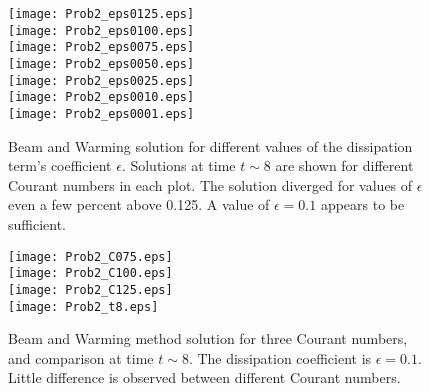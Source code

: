 \documentclass[11pt]{article}
\begin{document}
\begin{figure}[p!]
\begin{center}
\texttt{[image: Prob2\_eps0125.eps]} \vspace*{-0.5cm} \\
\texttt{[image: Prob2\_eps0100.eps]} \vspace*{-0.5cm} \\
\texttt{[image: Prob2\_eps0075.eps]} \vspace*{-0.5cm} \\
\texttt{[image: Prob2\_eps0050.eps]} \vspace*{-0.5cm} \\
\texttt{[image: Prob2\_eps0025.eps]} \vspace*{-0.5cm} \\
\texttt{[image: Prob2\_eps0010.eps]} \vspace*{-0.5cm} \\
\texttt{[image: Prob2\_eps0001.eps]}
\\[0.5cm]
\caption{Beam and Warming solution for different values of the dissipation term's coefficient $\epsilon$. Solutions at time $t \sim 8$ are shown for different Courant numbers in each plot. The solution diverged for values of $\epsilon$ even a few percent above 0.125. A value of $\epsilon=0.1$ appears to be sufficient.}
\label{fig:BeamWarming_Epsilon}
\end{center}
\end{figure}

\begin{figure}[p!]
\begin{center}
\texttt{[image: Prob2\_C075.eps]} \\
\texttt{[image: Prob2\_C100.eps]} \\
\texttt{[image: Prob2\_C125.eps]} \\
\texttt{[image: Prob2\_t8.eps]}
\\[0.5cm]
\caption{Beam and Warming method solution for three Courant numbers, and comparison at time $t \sim 8$. The dissipation coefficient is $\epsilon = 0.1$. Little difference is observed between different Courant numbers.}
\label{fig:BeamWarming}
\end{center}
\end{figure}

\end{document}
